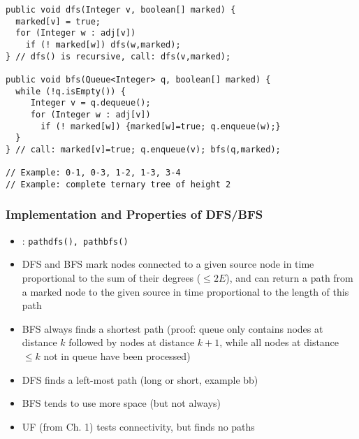 \documentclass[handout]{beamer}
\newcommand{\git}{https://github.com/marcbezem/INF102/blob/master}
\begin{document}

\begin{verbatim}
public void dfs(Integer v, boolean[] marked) {
  marked[v] = true;
  for (Integer w : adj[v])
    if (! marked[w]) dfs(w,marked);
} // dfs() is recursive, call: dfs(v,marked);

public void bfs(Queue<Integer> q, boolean[] marked) {
  while (!q.isEmpty()) {
     Integer v = q.dequeue();
     for (Integer w : adj[v]) 
       if (! marked[w]) {marked[w]=true; q.enqueue(w);}
  }
} // call: marked[v]=true; q.enqueue(v); bfs(q,marked);
 
// Example: 0-1, 0-3, 1-2, 1-3, 3-4
// Example: complete ternary tree of height 2
\end{verbatim}

\begin{frame}
    \frametitle{Implementation and Properties of DFS/BFS}

\begin{itemize}[<+->]
\item \href{\git/programs/graphs/LinkedListG.java}%
{\color{red}{LinkedListG.java}}: {\tt pathdfs(), pathbfs()}
\item DFS and BFS mark nodes connected to a given source node
in time proportional to the sum of their degrees ($\leq 2E$),
and can return a path from a marked node to the given source
in time proportional to the length of this path
\item BFS always finds a shortest path 
(proof: queue only contains nodes at distance $k$ 
followed by nodes at distance $k+1$, 
while all nodes at distance $\leq k$ not in queue have been processed)
\item DFS finds a left-most path (long or short, example bb)
\item BFS tends to use more space (but not always)
\item UF (from Ch. 1) tests connectivity, but finds no paths
\end{itemize}
\end{frame}
\end{document}

